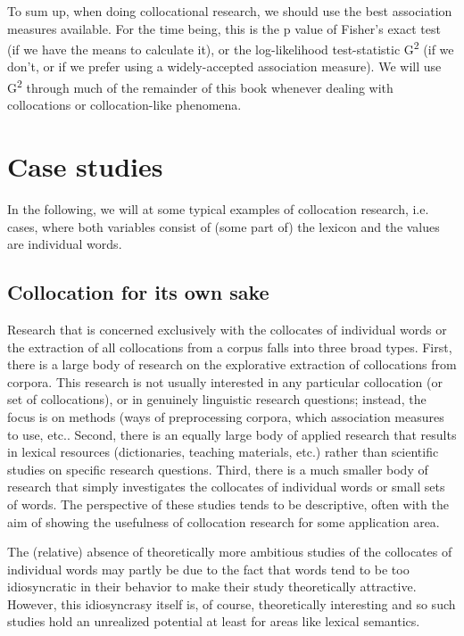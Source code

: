 To sum up, when doing collocational research, we should use the best association measures available. For the time being, this is the p value of Fisher's exact test (if we have the means to calculate it), or the log-likelihood test-statistic G\textsuperscript{2} (if we don't, or if we prefer using a widely-accepted association measure). We will use G\textsuperscript{2} through much of the remainder of this book whenever dealing with collocations or collocation-like phenomena.

\section{Case studies}
\label{sec:collocatescasestudies}

In the following, we will at some typical examples of collocation research, i.e. cases, where both variables consist of (some part of) the lexicon and the values are individual words. 

\subsection{Collocation for its own sake}
\label{sec:collocationforitsownsake}

Research that is concerned exclusively with the collocates of individual words or the extraction of all collocations from a corpus falls into three broad types. First, there is a large body of research on the explorative extraction of collocations from corpora. This research is not usually interested in any particular collocation (or set of collocations), or in genuinely linguistic research questions; instead, the focus is on methods (ways of preprocessing corpora, which association measures to use, etc.. Second, there is an equally large body of applied research that results in lexical resources (dictionaries, teaching materials, etc.) rather than scientific studies on specific research questions. Third, there is a much smaller body of research that simply investigates the collocates of individual words or small sets of words. The perspective of these studies tends to be descriptive, often with the aim of showing the usefulness of collocation research for some application area.

The (relative) absence of theoretically more ambitious studies of the collocates of individual words may partly be due to the fact that words tend to be too idiosyncratic in their behavior to make their study theoretically attractive. However, this idiosyncrasy itself is, of course, theoretically interesting and so such studies hold an unrealized potential at least for areas like lexical semantics.

